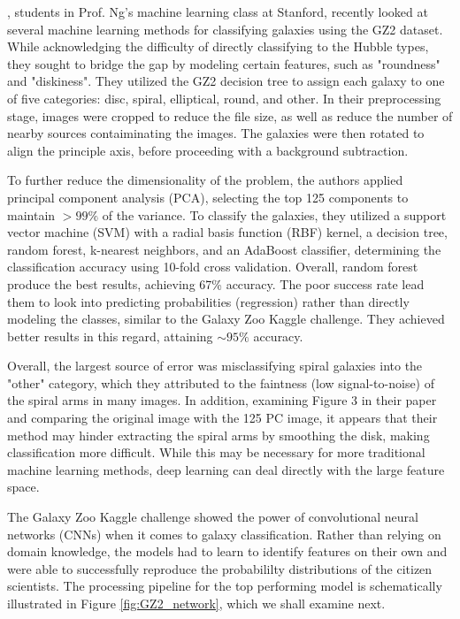 \documentclass{article}
\begin{document}

\cite{stanford}, students in Prof. Ng's machine learning class at Stanford, recently looked at several machine learning methods for classifying galaxies using the GZ2 dataset. While acknowledging the difficulty of directly classifying to the Hubble types, they sought to bridge the gap by modeling certain features, such as "roundness" and "diskiness". They utilized the GZ2 decision tree to assign each galaxy to one of five categories: disc, spiral, elliptical, round, and other. In their preprocessing stage, images were cropped to reduce the file size, as well as reduce the number of nearby sources contaiminating the images. The galaxies were then rotated to align the principle axis, before proceeding with a background subtraction.

To further reduce the dimensionality of the problem, the authors applied principal component analysis (PCA), selecting the top 125 components to maintain $>99\%$ of the variance. To classify the galaxies, they utilized a support vector machine (SVM) with a radial basis function (RBF) kernel, a decision tree, random forest, k-nearest neighbors, and an AdaBoost classifier, determining the classification accuracy using 10-fold cross validation. Overall, random forest produce the best results, achieving 67\% accuracy. The poor success rate lead them to look into predicting probabilities (regression) rather than directly modeling the classes, similar to the Galaxy Zoo Kaggle challenge. They achieved better results in this regard, attaining $\sim 95\%$ accuracy.

Overall, the largest source of error was misclassifying spiral galaxies into the "other" category, which they attributed to the faintness (low signal-to-noise) of the spiral arms in many images. In addition, examining Figure 3 in their paper and comparing the original image with the 125 PC image, it appears that their method may hinder extracting the spiral arms by smoothing the disk, making classification more difficult. While this may be necessary for more traditional machine learning methods, deep learning can deal directly with the large feature space.


The Galaxy Zoo Kaggle challenge showed the power of convolutional neural networks (CNNs) when it comes to galaxy classification. Rather than relying on domain knowledge, the models had to learn to identify features on their own and were able to successfully reproduce the probabililty distributions of the citizen scientists. The processing pipeline for the top performing model \citep{2015MNRAS.450.1441D} is schematically illustrated in Figure \ref{fig:GZ2_network}, which we shall examine next. 
\end{document}
